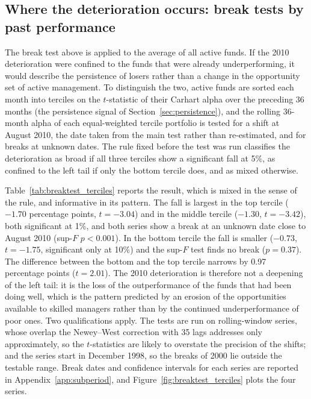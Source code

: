 \documentclass[12pt, oneside]{report}
\begin{document}
\subsection{Where the deterioration occurs: break tests by past performance}
\label{sec:break_terciles}

\noindent The break test above is applied to the average of all active
funds. If the 2010 deterioration were confined to the funds that were
already underperforming, it would describe the persistence of losers
rather than a change in the opportunity set of active management. To
distinguish the two, active funds are sorted each month into terciles on
the $t$-statistic of their Carhart alpha over the preceding 36 months
(the persistence signal of Section~\ref{sec:persistence}), and the
rolling 36-month alpha of each equal-weighted tercile portfolio is
tested for a shift at August 2010, the date taken from the main test
rather than re-estimated, and for breaks at unknown dates. The rule fixed
before the test was run classifies the deterioration as broad if all
three terciles show a significant fall at 5\%, as confined to the left
tail if only the bottom tercile does, and as mixed otherwise.

Table~\ref{tab:breaktest_terciles} reports the result, which is mixed in
the sense of the rule, and informative in its pattern. The fall is
largest in the top tercile ($-1.70$ percentage points, $t = -3.04$) and in
the middle tercile ($-1.30$, $t = -3.42$), both significant at 1\%, and
both series show a break at an unknown date close to August 2010
(sup-$F$ $p < 0.001$). In the bottom tercile the fall is smaller
($-0.73$, $t = -1.75$, significant only at 10\%) and the sup-$F$ test
finds no break ($p = 0.37$). The difference between the bottom and the
top tercile narrows by 0.97 percentage points ($t = 2.01$). The 2010
deterioration is therefore not a deepening of the left tail: it is the
loss of the outperformance of the funds that had been doing well, which
is the pattern predicted by an erosion of the opportunities available to
skilled managers rather than by the continued underperformance of poor
ones. Two qualifications apply. The tests are run on rolling-window
series, whose overlap the Newey--West correction with 35 lags addresses
only approximately, so the $t$-statistics are likely to overstate the
precision of the shifts; and the series start in December 1998, so the
breaks of 2000 lie outside the testable range. Break dates and
confidence intervals for each series are reported in
Appendix~\ref{app:subperiod}, and Figure~\ref{fig:breaktest_terciles}
plots the four series.
\end{document}

